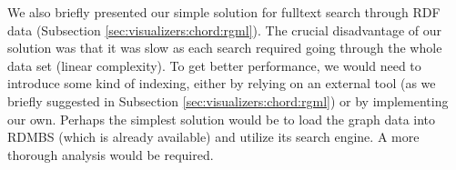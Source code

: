 We also briefly presented our simple solution for fulltext search through RDF data (Subsection \ref{sec:visualizers:chord:rgml}). The crucial disadvantage of our solution was that it was slow as each search required going through the whole data set (linear complexity). To get better performance, we would need to introduce some kind of indexing, either by relying on an external tool (as we briefly suggested in Subsection \ref{sec:visualizers:chord:rgml}) or by implementing our own. Perhaps the simplest solution would be to load the graph data into RDMBS (which is already available) and utilize its search engine. A more thorough analysis would be required.